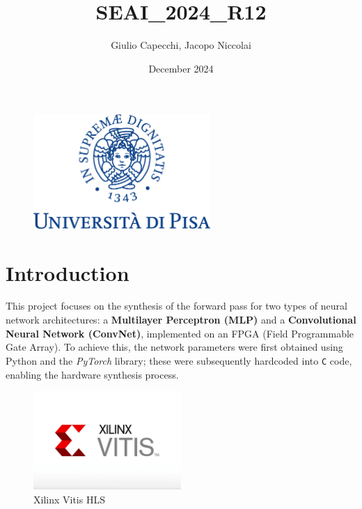 \documentclass{article}
\title{SEAI\_2024\_R12}
\author{Giulio Capecchi, Jacopo Niccolai}
\date{December 2024}
\begin{document}
\maketitle

\vspace{3cm}
\begin{figure}[H]
    \centering
    \includegraphics[width=0.6\textwidth]{assets/unipi.png}
    \label{fig:unipi_logo}
\end{figure}

\newpage

\tableofcontents

\newpage

\section{Introduction}
This project focuses on the synthesis of the forward pass for two types of neural network architectures: a \textbf{Multilayer Perceptron (MLP)} and a \textbf{Convolutional Neural Network (ConvNet)}, implemented on an FPGA (Field Programmable Gate Array).  To achieve this, the network parameters were first obtained using Python and the \textit{PyTorch} library; these were subsequently hardcoded into \texttt{C} code, enabling the hardware synthesis process.


\begin{figure}[H]
    \centering
    \includegraphics[width=0.5\textwidth]{assets/vitis-hls.png}
    \caption{Xilinx Vitis HLS}
    \label{fig:vitis_hls}
\end{figure}
\end{document}
